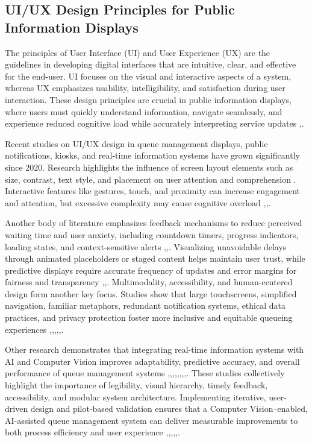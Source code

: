\documentclass{research}
\begin{document}
\subsection*{UI/UX Design Principles for Public Information Displays}
The principles of User Interface (UI) and User Experience (UX) are the guidelines in developing digital interfaces that are intuitive, clear, and effective for the end-user. UI focuses on the visual and interactive aspects of a system, whereas UX emphasizes usability, intelligibility, and satisfaction during user interaction. These design principles are crucial in public information displays, where users must quickly understand information, navigate seamlessly, and experience reduced cognitive load while accurately interpreting service updates \cite{ref54},\cite{ref55}.

Recent studies on UI/UX design in queue management displays, public notifications, kiosks, and real-time information systems have grown significantly since 2020. Research highlights the influence of screen layout elements such as size, contrast, text style, and placement on user attention and comprehension \cite{ref54}. Interactive features like gestures, touch, and proximity can increase engagement and attention, but excessive complexity may cause cognitive overload \cite{ref56},\cite{ref57},\cite{ref58}.

Another body of literature emphasizes feedback mechanisms to reduce perceived waiting time and user anxiety, including countdown timers, progress indicators, loading states, and context-sensitive alerts \cite{ref59},\cite{ref60},\cite{ref61}. Visualizing unavoidable delays through animated placeholders or staged content helps maintain user trust, while predictive displays require accurate frequency of updates and error margins for fairness and transparency \cite{ref62},\cite{ref63},\cite{ref53}. Multimodality, accessibility, and human-centered design form another key focus. Studies show that large touchscreens, simplified navigation, familiar metaphors, redundant notification systems, ethical data practices, and privacy protection foster more inclusive and equitable queueing experiences \cite{ref54},\cite{ref55},\cite{ref38},\cite{ref64},\cite{ref62},\cite{ref4}.

Other research demonstrates that integrating real-time information systems with AI and Computer Vision improves adaptability, predictive accuracy, and overall performance of queue management systems \cite{ref64},\cite{ref65},\cite{ref66},\cite{ref67},\cite{ref68},\cite{ref56},\cite{ref53},\cite{ref69},\cite{ref54}. These studies collectively highlight the importance of legibility, visual hierarchy, timely feedback, accessibility, and modular system architecture. Implementing iterative, user-driven design and pilot-based validation ensures that a Computer Vision–enabled, AI-assisted queue management system can deliver measurable improvements to both process efficiency and user experience \cite{ref56},\cite{ref61},\cite{ref59},\cite{ref63},\cite{ref55},\cite{ref65}.
\end{document}
